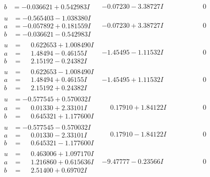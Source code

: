 \documentclass[1p]{elsarticle_modified}
\theoremstyle{definition}
\begin{document}
$$\begin{array}{c|c|c}
\begin{aligned}
b &= -0.036621 + 0.542983 I\end{aligned}
 & -0.07230 - 3.38727 I & \phantom{-0.000000 } 0 \\ \hline\begin{aligned}
u &= -0.565403 - 1.038380 I \\
a &= -0.057892 + 0.181559 I \\
b &= -0.036621 - 0.542983 I\end{aligned}
 & -0.07230 + 3.38727 I & \phantom{-0.000000 } 0 \\ \hline\begin{aligned}
u &= \phantom{-}0.622653 + 1.008490 I \\
a &= \phantom{-}1.48494 - 0.46155 I \\
b &= \phantom{-}2.15192 - 0.24382 I\end{aligned}
 & -1.45495 - 1.11532 I & \phantom{-0.000000 } 0 \\ \hline\begin{aligned}
u &= \phantom{-}0.622653 - 1.008490 I \\
a &= \phantom{-}1.48494 + 0.46155 I \\
b &= \phantom{-}2.15192 + 0.24382 I\end{aligned}
 & -1.45495 + 1.11532 I & \phantom{-0.000000 } 0 \\ \hline\begin{aligned}
u &= -0.577545 + 0.570032 I \\
a &= \phantom{-}0.01330 + 2.33101 I \\
b &= \phantom{-}0.645321 + 1.177600 I\end{aligned}
 & \phantom{-}0.17910 + 1.84122 I & \phantom{-0.000000 } 0 \\ \hline\begin{aligned}
u &= -0.577545 - 0.570032 I \\
a &= \phantom{-}0.01330 - 2.33101 I \\
b &= \phantom{-}0.645321 - 1.177600 I\end{aligned}
 & \phantom{-}0.17910 - 1.84122 I & \phantom{-0.000000 } 0 \\ \hline\begin{aligned}
u &= \phantom{-}0.463006 + 1.097170 I \\
a &= \phantom{-}1.216860 + 0.615636 I \\
b &= \phantom{-}2.51400 + 0.69702 I\end{aligned}
 & -9.47777 - 0.23566 I & \phantom{-0.000000 } 0 \\ \hline\begin{aligned}

\end{aligned}
\end{array}$$
\end{document}
